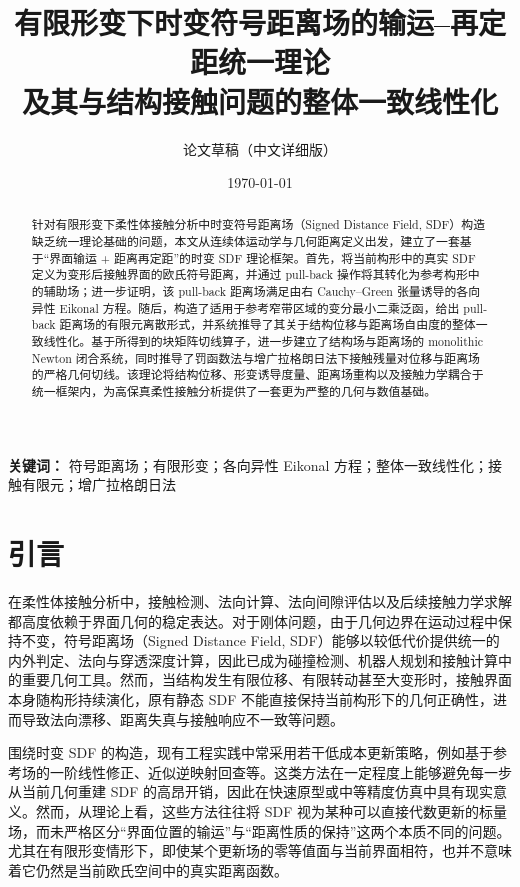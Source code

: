 \documentclass[12pt,a4paper]{ctexart}
\title{有限形变下时变符号距离场的输运--再定距统一理论\\及其与结构接触问题的整体一致线性化}
\author{论文草稿（中文详细版）}
\date{\today}
\numberwithin{equation}{section}
\begin{document}
\maketitle

\begin{abstract}
针对有限形变下柔性体接触分析中时变符号距离场（Signed Distance Field, SDF）构造缺乏统一理论基础的问题，本文从连续体运动学与几何距离定义出发，建立了一套基于``界面输运 + 距离再定距''的时变 SDF 理论框架。首先，将当前构形中的真实 SDF 定义为变形后接触界面的欧氏符号距离，并通过 pull-back 操作将其转化为参考构形中的辅助场；进一步证明，该 pull-back 距离场满足由右 Cauchy--Green 张量诱导的各向异性 Eikonal 方程。随后，构造了适用于参考窄带区域的变分最小二乘泛函，给出 pull-back 距离场的有限元离散形式，并系统推导了其关于结构位移与距离场自由度的整体一致线性化。基于所得到的块矩阵切线算子，进一步建立了结构场与距离场的 monolithic Newton 闭合系统，同时推导了罚函数法与增广拉格朗日法下接触残量对位移与距离场的严格几何切线。该理论将结构位移、形变诱导度量、距离场重构以及接触力学耦合于统一框架内，为高保真柔性接触分析提供了一套更为严整的几何与数值基础。
\end{abstract}

\noindent\textbf{关键词：} 符号距离场；有限形变；各向异性 Eikonal 方程；整体一致线性化；接触有限元；增广拉格朗日法

\tableofcontents
\newpage

\section{引言}

在柔性体接触分析中，接触检测、法向计算、法向间隙评估以及后续接触力学求解都高度依赖于界面几何的稳定表达。对于刚体问题，由于几何边界在运动过程中保持不变，符号距离场（Signed Distance Field, SDF）能够以较低代价提供统一的内外判定、法向与穿透深度计算，因此已成为碰撞检测、机器人规划和接触计算中的重要几何工具。然而，当结构发生有限位移、有限转动甚至大变形时，接触界面本身随构形持续演化，原有静态 SDF 不能直接保持当前构形下的几何正确性，进而导致法向漂移、距离失真与接触响应不一致等问题。

围绕时变 SDF 的构造，现有工程实践中常采用若干低成本更新策略，例如基于参考场的一阶线性修正、近似逆映射回查等。这类方法在一定程度上能够避免每一步从当前几何重建 SDF 的高昂开销，因此在快速原型或中等精度仿真中具有现实意义。然而，从理论上看，这些方法往往将 SDF 视为某种可以直接代数更新的标量场，而未严格区分``界面位置的输运''与``距离性质的保持''这两个本质不同的问题。尤其在有限形变情形下，即使某个更新场的零等值面与当前界面相符，也并不意味着它仍然是当前欧氏空间中的真实距离函数。
\end{document}
